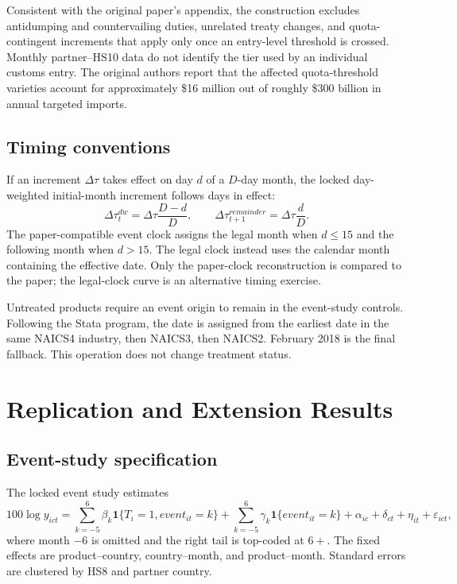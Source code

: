 Consistent with the original paper's appendix, the construction excludes antidumping and countervailing duties, unrelated treaty changes, and quota-contingent increments that apply only once an entry-level threshold is crossed. Monthly partner--HS10 data do not identify the tier used by an individual customs entry. The original authors report that the affected quota-threshold varieties account for approximately \$16 million out of roughly \$300 billion in annual targeted imports.

\subsection{Timing conventions}

If an increment $\Delta\tau$ takes effect on day $d$ of a $D$-day month, the locked day-weighted initial-month increment follows days in effect:
\begin{equation}
\Delta\tau^{dw}_{t}=\Delta\tau\frac{D-d}{D},\qquad
\Delta\tau^{remainder}_{t+1}=\Delta\tau\frac{d}{D}.
\end{equation}
The paper-compatible event clock assigns the legal month when $d\leq15$ and the following month when $d>15$. The legal clock instead uses the calendar month containing the effective date. Only the paper-clock reconstruction is compared to the paper; the legal-clock curve is an alternative timing exercise.

Untreated products require an event origin to remain in the event-study controls. Following the Stata program, the date is assigned from the earliest date in the same NAICS4 industry, then NAICS3, then NAICS2. February 2018 is the final fallback. This operation does not change treatment status.

\section{Replication and Extension Results}

\subsection{Event-study specification}

The locked event study estimates
\begin{equation}
100\log y_{ict}=\sum_{k=-5}^{6}\beta_k\mathbf{1}\{T_i=1,event_{it}=k\}
+\sum_{k=-5}^{6}\gamma_k\mathbf{1}\{event_{it}=k\}
+\alpha_{ic}+\delta_{ct}+\eta_{it}+\varepsilon_{ict},
\end{equation}
where month $-6$ is omitted and the right tail is top-coded at $6+$. The fixed effects are product--country, country--month, and product--month. Standard errors are clustered by HS8 and partner country.


